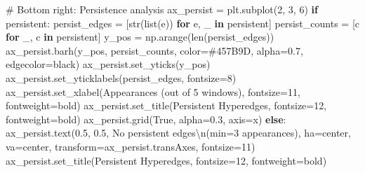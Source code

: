 \documentclass[
  11pt,
  letterpaper,
  oneside,
  openany]{book}
\newenvironment{Shaded}{\begin{snugshade}}{\end{snugshade}}
\newcommand{\BuiltInTok}[1]{\textcolor[rgb]{0.00,0.23,0.31}{#1}}
\newcommand{\CharTok}[1]{\textcolor[rgb]{0.13,0.47,0.30}{#1}}
\newcommand{\CommentTok}[1]{\textcolor[rgb]{0.37,0.37,0.37}{#1}}
\newcommand{\ControlFlowTok}[1]{\textcolor[rgb]{0.00,0.23,0.31}{\textbf{#1}}}
\newcommand{\DecValTok}[1]{\textcolor[rgb]{0.68,0.00,0.00}{#1}}
\newcommand{\FloatTok}[1]{\textcolor[rgb]{0.68,0.00,0.00}{#1}}
\newcommand{\KeywordTok}[1]{\textcolor[rgb]{0.00,0.23,0.31}{\textbf{#1}}}
\newcommand{\NormalTok}[1]{\textcolor[rgb]{0.00,0.23,0.31}{#1}}
\newcommand{\OperatorTok}[1]{\textcolor[rgb]{0.37,0.37,0.37}{#1}}
\newcommand{\StringTok}[1]{\textcolor[rgb]{0.13,0.47,0.30}{#1}}
\newcommand{\VariableTok}[1]{\textcolor[rgb]{0.07,0.07,0.07}{#1}}
\begin{document}
\begin{Shaded}
\begin{Highlighting}[]
\CommentTok{\# Bottom right: Persistence analysis}
\NormalTok{ax\_persist }\OperatorTok{=}\NormalTok{ plt.subplot(}\DecValTok{2}\NormalTok{, }\DecValTok{3}\NormalTok{, }\DecValTok{6}\NormalTok{)}
\ControlFlowTok{if}\NormalTok{ persistent:}
\NormalTok{    persist\_edges }\OperatorTok{=}\NormalTok{ [}\BuiltInTok{str}\NormalTok{(}\BuiltInTok{list}\NormalTok{(e)) }\ControlFlowTok{for}\NormalTok{ e, \_ }\KeywordTok{in}\NormalTok{ persistent]}
\NormalTok{    persist\_counts }\OperatorTok{=}\NormalTok{ [c }\ControlFlowTok{for}\NormalTok{ \_, c }\KeywordTok{in}\NormalTok{ persistent]}
\NormalTok{    y\_pos }\OperatorTok{=}\NormalTok{ np.arange(}\BuiltInTok{len}\NormalTok{(persist\_edges))}
\NormalTok{    ax\_persist.barh(y\_pos, persist\_counts, color}\OperatorTok{=}\StringTok{\textquotesingle{}\#457B9D\textquotesingle{}}\NormalTok{, }
\NormalTok{                    alpha}\OperatorTok{=}\FloatTok{0.7}\NormalTok{, edgecolor}\OperatorTok{=}\StringTok{\textquotesingle{}black\textquotesingle{}}\NormalTok{)}
\NormalTok{    ax\_persist.set\_yticks(y\_pos)}
\NormalTok{    ax\_persist.set\_yticklabels(persist\_edges, fontsize}\OperatorTok{=}\DecValTok{8}\NormalTok{)}
\NormalTok{    ax\_persist.set\_xlabel(}\StringTok{\textquotesingle{}Appearances (out of 5 windows)\textquotesingle{}}\NormalTok{, fontsize}\OperatorTok{=}\DecValTok{11}\NormalTok{, fontweight}\OperatorTok{=}\StringTok{\textquotesingle{}bold\textquotesingle{}}\NormalTok{)}
\NormalTok{    ax\_persist.set\_title(}\StringTok{\textquotesingle{}Persistent Hyperedges\textquotesingle{}}\NormalTok{, fontsize}\OperatorTok{=}\DecValTok{12}\NormalTok{, fontweight}\OperatorTok{=}\StringTok{\textquotesingle{}bold\textquotesingle{}}\NormalTok{)}
\NormalTok{    ax\_persist.grid(}\VariableTok{True}\NormalTok{, alpha}\OperatorTok{=}\FloatTok{0.3}\NormalTok{, axis}\OperatorTok{=}\StringTok{\textquotesingle{}x\textquotesingle{}}\NormalTok{)}
\ControlFlowTok{else}\NormalTok{:}
\NormalTok{    ax\_persist.text(}\FloatTok{0.5}\NormalTok{, }\FloatTok{0.5}\NormalTok{, }\StringTok{\textquotesingle{}No persistent edges}\CharTok{\textbackslash{}n}\StringTok{(min=3 appearances)\textquotesingle{}}\NormalTok{,}
\NormalTok{                   ha}\OperatorTok{=}\StringTok{\textquotesingle{}center\textquotesingle{}}\NormalTok{, va}\OperatorTok{=}\StringTok{\textquotesingle{}center\textquotesingle{}}\NormalTok{, transform}\OperatorTok{=}\NormalTok{ax\_persist.transAxes,}
\NormalTok{                   fontsize}\OperatorTok{=}\DecValTok{11}\NormalTok{)}
\NormalTok{    ax\_persist.set\_title(}\StringTok{\textquotesingle{}Persistent Hyperedges\textquotesingle{}}\NormalTok{, fontsize}\OperatorTok{=}\DecValTok{12}\NormalTok{, fontweight}\OperatorTok{=}\StringTok{\textquotesingle{}bold\textquotesingle{}}\NormalTok{)}


\end{Highlighting}
\end{Shaded}
\end{document}

